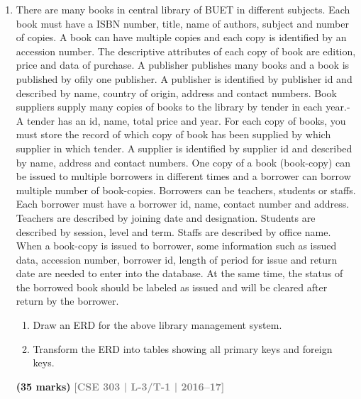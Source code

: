 \documentclass[12pt,a3paper]{article}
\newcommand{\yr}[1]{\hfill\textcolor{gray}{\small\textbf{[#1]}}}
\newcommand{\mk}[1]{\textcolor{orange!70!black}{\small\textbf{(#1 marks)}}}
\begin{document}
\begin{enumerate}
\begin{tcolorbox}[enhanced,breakable,ansbox,colback=cA!4,colframe=cA,boxrule=0.8pt,arc=5pt,title={\textbf{Answer}},fonttitle=\bfseries\color{white},colbacktitle=cA]
\begin{center}
\end{center}

\end{tcolorbox}

\item 
There are many books in central library of BUET in different subjects. Each book must
have a ISBN number, title, name of authors, subject and number of copies. A book can
have multiple copies and each copy is identified by an accession number. The
descriptive attributes of each copy of book are edition, price and data of purchase. A
publisher publishes many books and a book is published by ofily one publisher. A
publisher is identified by publisher id and described by name, country of origin,
address and contact numbers.
Book suppliers supply many copies of books to the library by tender in each year.- A
tender has an id, name, total price and year. For each copy of books, you must store the
record of which copy of book has been supplied by which supplier in which tender. A
supplier is identified by supplier id and described by name, address and contact
numbers.
One copy of a book (book-copy) can be issued to multiple borrowers in different times
and a borrower can borrow multiple number of book-copies. Borrowers can be
teachers, students or staffs. Each borrower must have a borrower id, name, contact
number and address. Teachers are described by joining date and designation. Students
are described by session, level and term. Staffs are described by office name.
When a book-copy is issued to borrower, some information such as issued data,
accession number, borrower id, length of period for issue and return date are needed to
enter into the database. At the same time, the status of the borrowed book should be
labeled as issued and will be cleared after return by the borrower.
\begin{enumerate}
  \item Draw an ERD for the above library management system.
  \item Transform the ERD into tables showing all primary keys and foreign keys.
\end{enumerate}
\mk{35} \yr{CSE 303 | L-3/T-1 | 2016--17}


\end{enumerate}
\end{document}
